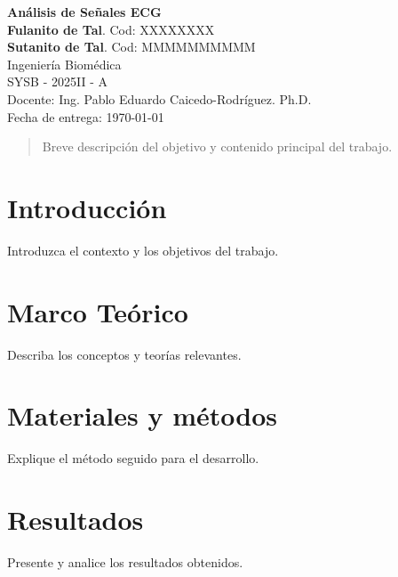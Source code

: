 \documentclass[12pt,a4paper]{article}
\newcommand{\tituloTrabajo}{Análisis de Señales ECG}
\newcommand{\autorA}{Fulanito de Tal}
\newcommand{\autorB}{Sutanito de Tal}
\newcommand{\carrera}{Ingeniería Biomédica}
\newcommand{\codigoEstudianteA}{XXXXXXXX}
\newcommand{\codigoEstudianteB}{ MMMMMMMMMM}
\newcommand{\cursoCodigo}{SYSB - 2025II - A} %
\newcommand{\docente}{Ing. Pablo Eduardo Caicedo-Rodríguez. Ph.D.}
\newcommand{\fechaEntrega}{\today}
\begin{document}
\thispagestyle{empty}
\begin{titlepage}
    \centering
    {\LARGE \textbf{\tituloTrabajo} \\
    }
    \vspace{2cm}
    {\large \textbf{\autorA}. Cod: \codigoEstudianteA} \\
    {\large \textbf{\autorB}. Cod: \codigoEstudianteB} \\
    \vspace{1cm}
    {\large \carrera} \\
    \vspace{0.5cm}
    {\large \cursoCodigo{}} \\
    Docente: \docente \\
    \vfill
    Fecha de entrega: \fechaEntrega
\end{titlepage}


\tableofcontents
\newpage


\vspace{10cm}
\begin{abstract}
    Breve descripción del objetivo y contenido principal del trabajo.
\end{abstract}
\vfill

\newpage

\section{Introducción}
Introduzca el contexto y los objetivos del trabajo.

\section{Marco Teórico}
Describa los conceptos y teorías relevantes.

\section{Materiales y métodos}
Explique el método seguido para el desarrollo.

\section{Resultados}
Presente y analice los resultados obtenidos.
\end{document}
